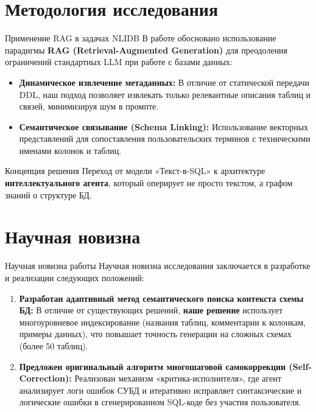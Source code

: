 \documentclass[10pt, aspectratio=169, unicode]{beamer}
\begin{document}
\section{Методология исследования}
\begin{frame}{Применение RAG в задачах NLIDB}
    В работе обосновано использование парадигмы \textbf{RAG (Retrieval-Augmented Generation)} для преодоления ограничений стандартных LLM при работе с базами данных:
    
    \begin{itemize}
        \item \textbf{Динамическое извлечение метаданных:} В отличие от статической передачи DDL, наш подход позволяет извлекать только релевантные описания таблиц и связей, минимизируя шум в промпте.
        \item \textbf{Семантическое связывание (Schema Linking):} Использование векторных представлений для сопоставления пользовательских терминов с техническими именами колонок и таблиц.
    \end{itemize}

    \begin{block}{Концепция решения}
        Переход от модели «Текст-в-SQL» к архитектуре \textbf{интеллектуального агента}, который оперирует не просто текстом, а графом знаний о структуре БД.
    \end{block}
\end{frame}

\section{Научная новизна}
\begin{frame}{Научная новизна работы}
    Научная новизна исследования заключается в разработке и реализации следующих положений:
    
    \begin{enumerate}
        \item \textbf{Разработан адаптивный метод семантического поиска контекста схемы БД:} 
        В отличие от существующих решений, \textbf{наше решение} использует многоуровневое индексирование (названия таблиц, комментарии к колонкам, примеры данных), что повышает точность генерации на сложных схемах (более 50 таблиц).
        
        \item \textbf{Предложен оригинальный алгоритм многошаговой самокоррекции (Self-Correction):}
        Реализован механизм «критика-исполнителя», где агент анализирует логи ошибок СУБД и итеративно исправляет синтаксические и логические ошибки в сгенерированном SQL-коде без участия пользователя.
        
    \end{enumerate}
\end{frame}
\end{document}
